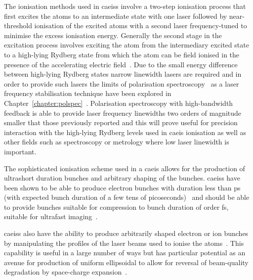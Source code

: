 The ionisation methods used in \glspl{caeis} involve a two-step ionisation process that first excites the atoms to an intermediate state with one laser followed by near-threshold ionisation of the excited atoms with a second laser frequency-tuned to minimise the excess ionisation energy.
Generally the second stage in the excitation process involves exciting the atom from the intermediary excited state to a high-lying Rydberg state from which the atom can be field ionised in the presence of the accelerating electric field~\cite{mcculloch_field_2017}.
Due to the small energy difference between high-lying Rydberg states narrow linewidth lasers are required and in order to provide such lasers the limits of polarisation spectroscopy~\cite{wieman_doppler-free_1976} as a laser frequency stabilisation technique have been explored in Chapter~\ref{chapter:polspec}~\cite{torrance_sub-kilohertz_2016}.
Polarisation spectroscopy with high-bandwidth feedback is able to provide laser frequency linewidths two orders of magnitude smaller that those previously reported and this will prove useful for precision interaction with the high-lying Rydberg levels used in \gls{caeis} ionisation as well as other fields such as spectroscopy or metrology where low laser linewidth is important.

The sophisticated ionisation scheme used in a \gls{caeis} allows for the production of ultrashort duration bunches and arbitrary shaping of the bunches.
\Glspl{caeis} have been shown to be able to produce electron bunches with duration less than \unit[130]{ps} (with expected bunch duration of a few tens of picoseconds)~\cite{speirs_identification_2017} and should be able to provide bunches suitable for compression to bunch duration of order \unit[100]{fs}, suitable for ultrafast imaging~\cite{van_oudheusden_compression_2010}.

\Glspl{caeis} also have the ability to produce arbitrarily shaped electron or ion bunches by manipulating the profiles of the laser beams used to ionise the atoms~\cite{mcculloch_arbitrarily_2011}.
This capability is useful in a large number of ways but has particular potential as an avenue for production of uniform ellipsoidal to allow for reversal of beam-quality degradation by space-charge expansion~\cite{luiten_how_2004,thompson_bunch_2015}.

